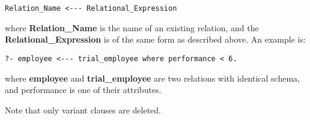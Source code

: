\begin{verbatim}
Relation_Name <--- Relational_Expression
\end{verbatim}

where {\bf Relation\_Name} is the name of an existing relation, and
the {\bf Relational\_Expression} is of the same form as described
above. An example is:

\begin{verbatim}
?- employee <--- trial_employee where performance < 6. 
\end{verbatim}

where {\bf employee} and {\bf trial\_employee} are two relations with 
identical schema, and performance is one of their attributes.

Note that only variant clauses are deleted.

